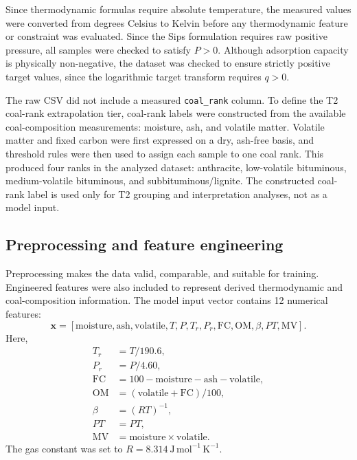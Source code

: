 \documentclass[11pt]{article}
\begin{document}
Since thermodynamic formulas require absolute temperature, the measured values
were converted from degrees Celsius to Kelvin before any thermodynamic feature
or constraint was evaluated. Since the Sips formulation requires raw positive
pressure, all samples were checked to satisfy \(P>0\). Although adsorption
capacity is physically non-negative, the dataset was checked to ensure strictly
positive target values, since the logarithmic target transform requires
\(q>0\).

The raw CSV did not include a measured \texttt{coal\_rank} column. To define
the T2 coal-rank extrapolation tier, coal-rank labels were constructed from the
available coal-composition measurements: moisture, ash, and volatile matter.
Volatile matter and fixed carbon were first expressed on a dry, ash-free basis,
and threshold rules were then used to assign each sample to one coal rank. This
produced four ranks in the analyzed dataset: anthracite, low-volatile
bituminous, medium-volatile bituminous, and subbituminous/lignite. The
constructed coal-rank label is used only for T2 grouping and interpretation
analyses, not as a model input.

\subsection{Preprocessing and feature engineering}

Preprocessing makes the data valid, comparable, and suitable for training.
Engineered features were also included to represent derived thermodynamic and
coal-composition information. The model input vector contains 12 numerical
features:
\[
    \mathbf{x} =
    [
    \mathrm{moisture},
    \mathrm{ash},
    \mathrm{volatile},
    T,
    P,
    T_r,
    P_r,
    \mathrm{FC},
    \mathrm{OM},
    \beta,
    PT,
    \mathrm{MV}
    ].
\]
Here,
\[
    \begin{aligned}
        T_r         & = T/190.6,                                              \\
        P_r         & = P/4.60,                                               \\
        \mathrm{FC} & = 100-\mathrm{moisture}-\mathrm{ash}-\mathrm{volatile}, \\
        \mathrm{OM} & = (\mathrm{volatile}+\mathrm{FC})/100,                  \\
        \beta       & = (RT)^{-1},                                            \\
        PT          & = P T,                                                  \\
        \mathrm{MV} & = \mathrm{moisture}\times\mathrm{volatile}.
    \end{aligned}
\]
The gas constant was set to \(R=8.314~\mathrm{J\,mol^{-1}\,K^{-1}}\).
\end{document}
